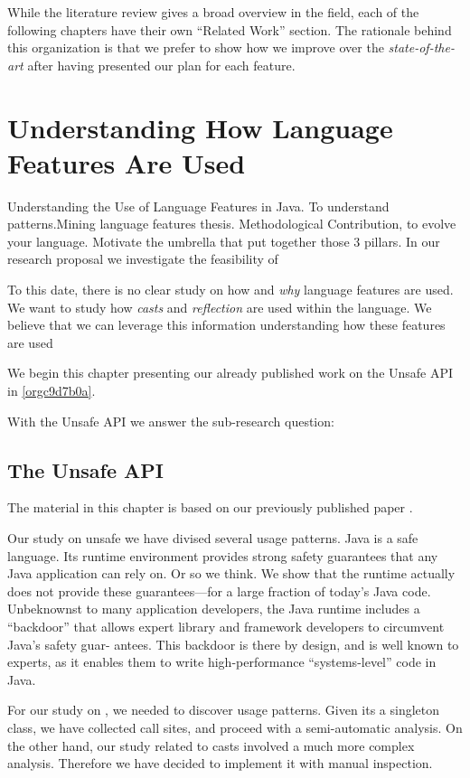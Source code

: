 \documentclass{usiinfdocprop}
\begin{document}
While the literature review gives a broad overview in the field, each of the following chapters have their own ``Related Work'' section. 
The rationale behind this organization is that we prefer to show how we improve over the \emph{state-of-the-art} after having presented our plan for each feature.

\chapter{Understanding How \java{} Language Features Are Used}
\label{sec:org627254f}
Understanding the Use of Language Features in Java.
To understand patterns.Mining language features thesis.
Methodological Contribution, to evolve your language.
Motivate the umbrella that put together those 3 pillars.
In our research proposal we investigate the feasibility of

To this date, there is no clear study on how and \emph{why} language features are used.
We want to study how \emph{casts} and \emph{reflection} are used within the \java{} language.
We believe that we can leverage this information
understanding how these features are used

We begin this chapter presenting our already published work on the Unsafe API in \ref{orgc9d7b0a}.

With the Unsafe API we answer the sub-research question:

\section{The Unsafe API \label{orgc9d7b0a}}
\label{sec:orgb1b6b36}

The material in this chapter is based on our previously published paper \citep{mastrangelo_use_2015}.

Our study on unsafe we have divised several usage patterns.
Java is a safe language. Its runtime environment provides strong safety guarantees that any Java application can rely on. Or so we think. We show that the runtime actually does not provide these guarantees—for a large fraction of today’s Java code. Unbeknownst to many application developers, the Java runtime includes a “backdoor” that allows expert library and framework developers to circumvent Java’s safety guar- antees. This backdoor is there by design, and is well known to experts, as it enables them to write high-performance “systems-level” code in Java.

For our study on \smu{}, we needed to discover usage patterns.
Given its a singleton class, we have collected call sites, and proceed with a semi-automatic analysis.
On the other hand, our study related to casts involved a much more complex analysis.
Therefore we have decided to implement it with manual inspection.
\end{document}
